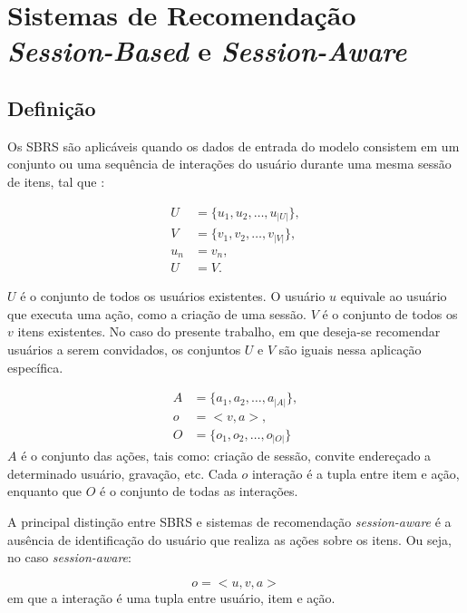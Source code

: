 \section{Sistemas de Recomendação \textit{Session-Based} e \textit{Session-Aware}}

\subsection{Definição}

Os SBRS são aplicáveis quando os dados
 de entrada do modelo consistem em um conjunto ou uma sequência de interações do usuário
 durante uma mesma sessão de itens, tal que \cite{survey_wang_2021}:

 \begin{equation*}
  \begin{aligned}
  U & = \{u_1, u_2, \ldots, u_{|U|}\}, \\
  V & = \{v_1, v_2, \ldots, v_{|V|}\}, \\
  u_n & = v_n, \\
  U & = V.
\end{aligned}
\end{equation*}

$U$ é o conjunto de todos os usuários existentes. O usuário $u$ equivale ao
usuário que executa uma ação, como a criação de uma sessão. $V$ é o conjunto de
todos os $v$ itens existentes. No caso do presente trabalho, em que deseja-se
recomendar usuários a serem convidados, os conjuntos $U$ e $V$ são iguais nessa
aplicação específica.

\begin{equation*}
  \begin{aligned}
  A & = \{a_1, a_2, \ldots, a_{|A|}\}, \\
  o & = <v, a>, \\
  O & = \{o_1, o_2, \ldots, o_{|O|}\}
  \end{aligned}
  \end{equation*}
$A$ é o conjunto das ações, tais como: criação de sessão, convite endereçado a
  determinado usuário, gravação, etc. Cada $o$ interação é a tupla entre item e
  ação, enquanto que $O$ é o conjunto de todas as interações.

  A principal distinção entre SBRS e sistemas de recomendação \textit{session-aware}
  é a ausência de identificação do usuário que realiza as ações sobre os itens.
  Ou seja, no caso \textit{session-aware}:

  \begin{equation}
    o = <u, v, a>
    \end{equation}
  em que a interação é uma tupla entre usuário, item e ação.

